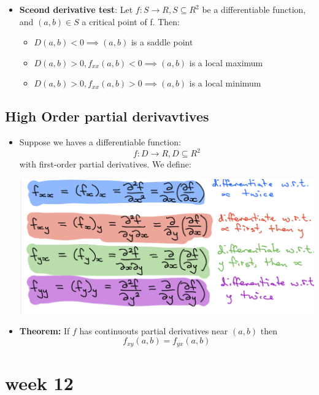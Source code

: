 \documentclass{article}
\begin{document}
\begin{itemize}
      \item \textbf{Sceond derivative test}: Let $f: S \rightarrow R, S \subseteq R^2$ be a differentiable function, and $(a,b) \in S$ a critical point of f. Then:
      \begin{itemize}
        \item $D(a,b)<0 \implies  (a,b)$ is a saddle point
        \item $D(a,b) > 0,f_{xx}(a,b)<0 \implies (a,b)$ is a local maximum
        \item $D(a,b) > 0,f_{xx}(a,b)>0 \implies (a,b)$ is a local minimum
      \end{itemize}
    \end{itemize}

  \subsection*{High Order partial derivavtives}
  \begin{itemize}
    \item Suppose we haves a differentiable function:
    $$
     f: D \rightarrow R, D \subseteq R^2
    $$
    with first-order partial derivatives. We define:

    \includegraphics[width=\linewidth]{Graphs/w10_5.png}

    \item \textbf{Theorem:} If $f$ has continuouts partial derivatives near $(a,b)$ then
    $$
      f_{xy}(a,b) = f_{yx}(a,b)
    $$
  \end{itemize}

  \section*{week 12}
\end{document}
